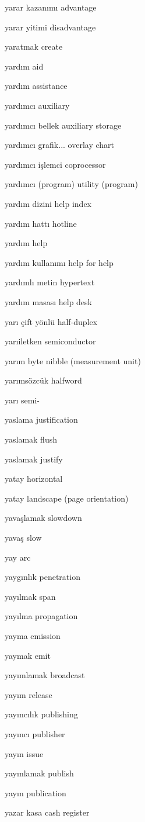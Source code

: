 \documentclass[12pt,fleqn]{article}\usepackage{../../common}
\begin{document}
yarar kazanımı advantage

yarar yitimi disadvantage

yaratmak create

yardım aid

yardım assistance

yardımcı auxiliary

yardımcı bellek auxiliary storage

yardımcı grafik... overlay chart

yardımcı işlemci coprocessor

yardımcı (program) utility (program)

yardım dizini help index

yardım hattı hotline

yardım help

yardım kullanımı help for help

yardımlı metin hypertext

yardım masası help desk

yarı çift yönlü half-duplex

yarıiletken semiconductor

yarım byte nibble (measurement unit)

yarımsözcük halfword

yarı semi-

yaslama justification

yaslamak flush

yaslamak justify

yatay horizontal

yatay landscape (page orientation)

yavaşlamak slowdown

yavaş slow

yay arc

yaygınlık penetration

yayılmak span

yayılma propagation

yayma emission

yaymak emit

yayımlamak broadcast

yayım release

yayıncılık publishing

yayıncı publisher

yayın issue

yayınlamak publish

yayın publication

yazar kasa cash register
\end{document}
